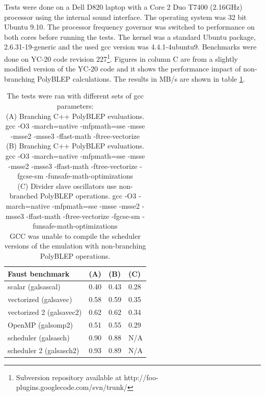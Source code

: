 \documentclass[11pt,a4paper]{article}
\begin{document}
Tests were done on a Dell D820 laptop with a Core 2 Duo T7400 (2.16GHz) processor using the internal sound interface. The operating system was 32 bit Ubuntu 9.10. The processor frequency governor was switched to performance on both cores before running the tests. The kernel was a standard Ubuntu package, 2.6.31-19-generic and the used gcc version was 4.4.1-4ubuntu9. Benchmarks were done on YC-20 code revision 227\footnote{Subversion repository available at http://foo-plugins.googlecode.com/svn/trunk/}. Figures in column C are from a slightly modified version of the YC-20 code and it shows the performance impact of non-branching PolyBLEP calculations. The results in MB/s are shown in table \ref{table:performance}.

\begin{table}[h]
 \begin{center}
\begin{tabular}{|l|l|l|l|}

      \hline
      Faust benchmark          & (A)  & (B)  & (C) \\
      \hline\hline
      scalar (galsascal)       & 0.40 & 0.43 & 0.28 \\
      vectorized (galsavec)    & 0.58 & 0.59 & 0.35 \\
      vectorized 2 (galsavec2) & 0.62 & 0.62 & 0.34 \\
      OpenMP (galsomp2)        & 0.51 & 0.55 & 0.29 \\
      scheduler (galsasch)     & 0.90 & 0.88 & N/A \\
      scheduler 2 (galsasch2)  & 0.93 & 0.89 & N/A \\
      \hline

\end{tabular}
\caption{The tests were ran with different sets of gcc parameters: \\
(A) Branching C++ PolyBLEP evaluations. gcc -O3 -march=native -mfpmath=sse -msse -msse2 -msse3 -ffast-math -ftree-vectorize \\
(B) Branching C++ PolyBLEP evaluations. gcc -O3 -march=native -mfpmath=sse -msse -msse2 -msse3 -ffast-math -ftree-vectorize -fgcse-sm  -funsafe-math-optimizations \\
(C) Divider slave oscillators use non-branched PolyBLEP operations. gcc -O3 -march=native -mfpmath=sse -msse -msse2 -msse3 -ffast-math -ftree-vectorize -fgcse-sm  -funsafe-math-optimizations \\
GCC was unable to compile the scheduler versions of the emulation with non-branching PolyBLEP operations.\\
}\label{table:performance}
 \end{center}
\end{table}
\end{document}
